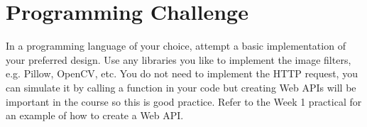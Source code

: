 \documentclass{csse4400}
\begin{document}
\section{Programming Challenge}
In a programming language of your choice,
attempt a basic implementation of your preferred design.
Use any libraries you like to implement the image filters, e.g. Pillow, OpenCV, etc.
You do not need to implement the HTTP request, you can simulate it by calling a function in your code but creating Web APIs will be important in the course so this is good practice.
Refer to the Week 1 practical for an example of how to create a Web API.
\end{document}
